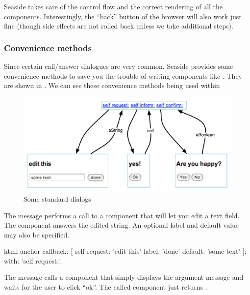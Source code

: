 \documentclass[a4paper,10pt,twoside]{book}
\begin{document}
Seaside takes care of the control flow and the correct rendering of all the components.
Interestingly, the ``back'' button of the browser will also work just fine (though side effects are not rolled back unless we take additional steps).

\subsubsection{Convenience methods}

Since certain call/answer dialogues are very common, Seaside provides some convenience methods to save you the trouble of writing components like .
They are shown in .
We can see these convenience methods being used within  

\begin{figure}[b]
\begin{center}
\includegraphics[width=\textwidth]{dialogs}
\caption{Some standard dialogs}
\label{fig:dialogs}
\end{center}
\end{figure}

The message  performs a call to a component that will let you edit a text field.
The component answers the edited string.
An optional label and default value may also be specified.

\begin{code}{}
html anchor
	callback: [ self request: 'edit this' label: 'done' default: 'some text' ];
	with: 'self request:'.
\end{code}

The message  calls a component that simply displays the argument message and waits for the user to click ``ok''.
The called component just returns .
\end{document}
